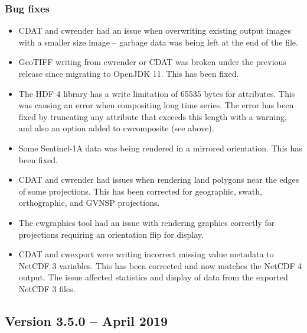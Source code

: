 \subsubsection*{ Bug fixes}
\begin{itemize}

  \item CDAT and cwrender had an issue when overwriting existing output images
  with a smaller size image -- garbage data was being left at the end of the
  file.
  
  \item GeoTIFF writing from cwrender or CDAT was broken under the previous
  release since migrating to OpenJDK 11.  This has been fixed.
  
  \item The HDF 4 library has a write limitation of 65535 bytes for attributes.
  This was causing an error when compositing long time series.  The error
  has been fixed by truncating any attribute that exceeds this length with
  a warning, and also an option added to cwcomposite (see above).
  
  \item Some Sentinel-1A data was being rendered in a mirrored orientation.
  This has been fixed.
  
  \item CDAT and cwrender had issues when rendering land polygons near the
  edges of some projections.  This has been corrected for geographic,
  swath, orthographic, and GVNSP projections.
  
  \item The cwgraphics tool had an issue with rendering graphics correctly
  for projections requiring an orientation flip for display.

  \item CDAT and cwexport were writing incorrect missing value metadata to
  NetCDF 3 variables.  This has been corrected and now matches the NetCDF
  4 output.  The issue affected statistics and display of data from the
  exported NetCDF 3 files.

\end{itemize}


\subsection*{Version 3.5.0 -- April 2019}


